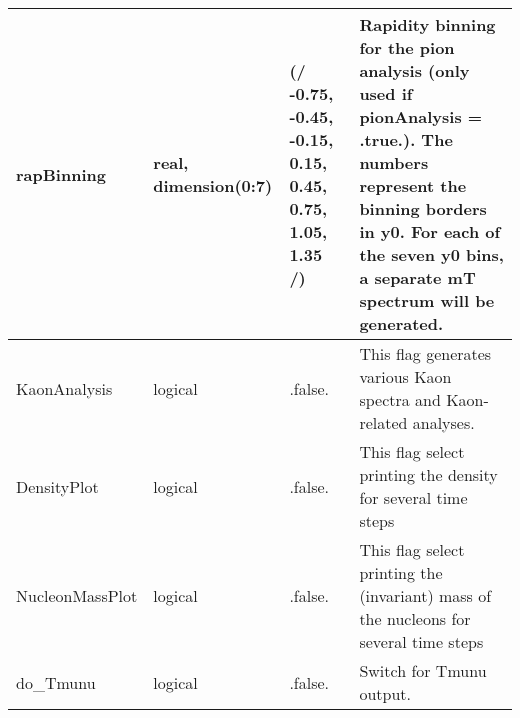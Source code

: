 \documentclass{article}
\begin{document}
\begin{longtable}{llll}
\midrule
rapBinning & \begin{minipage}[t]{2cm}real, dimension(0:7)\end{minipage} & \begin{minipage}[t]{2cm}(/ -0.75, -0.45, -0.15, 0.15, 0.45, 0.75, 1.05, 1.35 /)\end{minipage} & \begin{minipage}[t]{12cm}Rapidity binning for the pion analysis (only used if pionAnalysis = .true.). The numbers represent the binning borders in y0. For each of the seven y0 bins, a separate mT spectrum will be generated.\end{minipage}\\*
\midrule
KaonAnalysis & \begin{minipage}[t]{2cm}logical\end{minipage} & \begin{minipage}[t]{2cm}.false.\end{minipage} & \begin{minipage}[t]{12cm}This flag generates various Kaon spectra and Kaon-related analyses.\end{minipage}\\*
\midrule
DensityPlot & \begin{minipage}[t]{2cm}logical\end{minipage} & \begin{minipage}[t]{2cm}.false.\end{minipage} & \begin{minipage}[t]{12cm}This flag select printing the density for several time steps\end{minipage}\\*
\midrule
NucleonMassPlot & \begin{minipage}[t]{2cm}logical\end{minipage} & \begin{minipage}[t]{2cm}.false.\end{minipage} & \begin{minipage}[t]{12cm}This flag select printing the (invariant) mass of the nucleons for several time steps\end{minipage}\\*
\midrule
do\_Tmunu & \begin{minipage}[t]{2cm}logical\end{minipage} & \begin{minipage}[t]{2cm}.false.\end{minipage} & \begin{minipage}[t]{12cm}Switch for Tmunu output.\end{minipage}\\*

\end{longtable}
\end{document}
